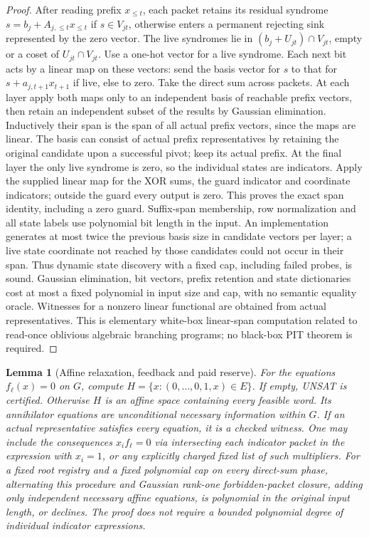 \documentclass[11pt]{article}
\newtheorem{lemma}[theorem]{Lemma}
\begin{document}
\begin{proof}
After reading prefix $x_{\le t}$, each packet retains its residual syndrome $s=b_j+A_{j,\le t}x_{\le t}$ if $s\in V_{jt}$, otherwise enters a permanent rejecting sink represented by the zero vector. The live syndromes lie in $(b_j+U_{jt})\cap V_{jt}$, empty or a coset of $U_{jt}\cap V_{jt}$. Use a one-hot vector for a live syndrome. Each next bit acts by a linear map on these vectors: send the basis vector for $s$ to that for $s+a_{j,t+1}x_{t+1}$ if live, else to zero. Take the direct sum across packets. At each layer apply both maps only to an independent basis of reachable prefix vectors, then retain an independent subset of the results by Gaussian elimination. Inductively their span is the span of all actual prefix vectors, since the maps are linear. The basis can consist of actual prefix representatives by retaining the original candidate upon a successful pivot; keep its actual prefix. At the final layer the only live syndrome is zero, so the individual states are indicators. Apply the supplied linear map for the XOR sums, the guard indicator and coordinate indicators; outside the guard every output is zero. This proves the exact span identity, including a zero guard. Suffix-span membership, row normalization and all state labels use polynomial bit length in the input. An implementation generates at most twice the previous basis size in candidate vectors per layer; a live state coordinate not reached by those candidates could not occur in their span. Thus dynamic state discovery with a fixed cap, including failed probes, is sound. Gaussian elimination, bit vectors, prefix retention and state dictionaries cost at most a fixed polynomial in input size and cap, with no semantic equality oracle. Witnesses for a nonzero linear functional are obtained from actual representatives. This is elementary white-box linear-span computation related to read-once oblivious algebraic branching programs; no black-box PIT theorem is required.
\end{proof}
\begin{lemma}[Affine relaxation, feedback and paid reserve]\label{lem:da21-close}
For the equations $f_\ell(x)=0$ on $G$, compute $H=\{x:(0,\ldots,0,1,x)\in E\}$. If empty, UNSAT is certified. Otherwise $H$ is an affine space containing every feasible word. Its annihilator equations are unconditional necessary information within $G$. If an actual representative satisfies every equation, it is a checked witness. One may include the consequences $x_i f_\ell=0$ via intersecting each indicator packet in the expression with $x_i=1$, or any explicitly charged fixed list of such multipliers. For a fixed root registry and a fixed polynomial cap on every direct-sum phase, alternating this procedure and Gaussian rank-one forbidden-packet closure, adding only independent necessary affine equations, is polynomial in the original input length, or declines. The proof does not require a bounded polynomial degree of individual indicator expressions.
\end{lemma}
\end{document}
